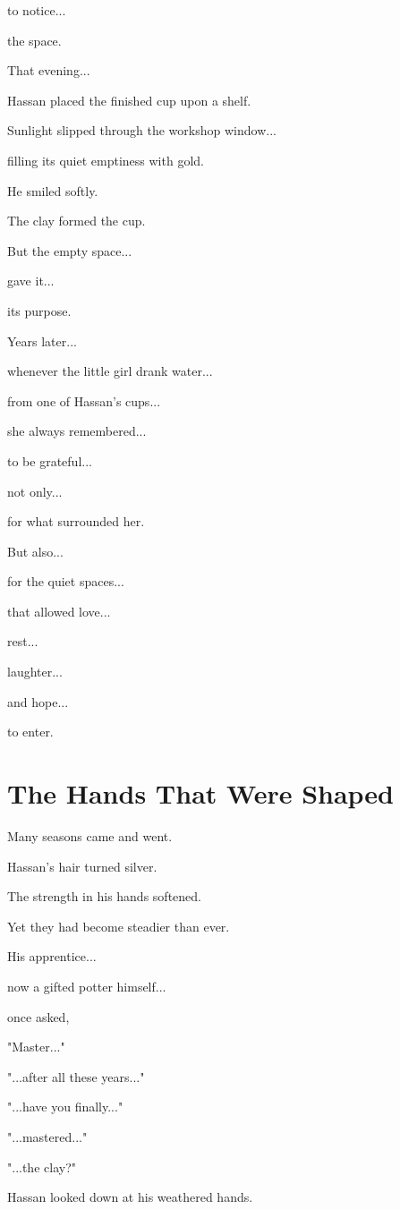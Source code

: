 \documentclass[12pt,openany]{book}
\begin{document}
to notice...

the space.

That evening...

Hassan placed the finished cup upon a shelf.

Sunlight slipped through the workshop window...

filling its quiet emptiness with gold.

He smiled softly.

The clay formed the cup.

But the empty space...

gave it...

its purpose.

Years later...

whenever the little girl drank water...

from one of Hassan's cups...

she always remembered...

to be grateful...

not only...

for what surrounded her.

But also...

for the quiet spaces...

that allowed love...

rest...

laughter...

and hope...

to enter.
\section*{The Hands That Were Shaped}

Many seasons came and went.

Hassan's hair turned silver.

The strength in his hands softened.

Yet they had become steadier than ever.

His apprentice...

now a gifted potter himself...

once asked,

"Master..."

"...after all these years..."

"...have you finally..."

"...mastered..."

"...the clay?"

Hassan looked down at his weathered hands.
\end{document}
